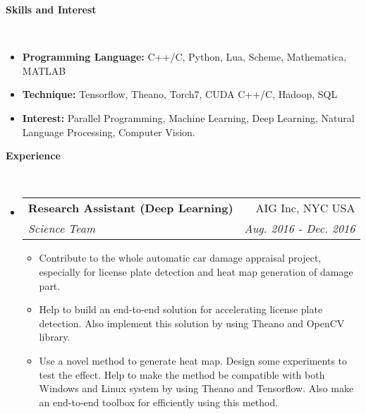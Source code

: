 \documentclass[a4paper,10pt]{article}
\makeatletter
\newcommand{\resitem}[1]{\item #1 \vspace{-2pt}}
\renewcommand{\normalsize}{\fontsize{12pt}{\baselineskip}\selectfont}
\newcommand{\resheading}[1]{{\large \colorbox{mygrey}{\begin{minipage}{\textwidth}{\textbf{#1 \vphantom{p\^{E}}}}\end{minipage}}}}
\newcommand{\ressubheading}[4]{
	\begin{tabular*}{6.5in}{l@{\extracolsep{\fill}}r}
		\textbf{#1} & #2 \\
		\textit{#3} & \textit{#4} \\
	\end{tabular*}\vspace{-6pt}}
\makeatother
\begin{document}
	\resheading{Skills and Interest}\\
	\begin{itemize}
		\item \textbf{Programming Language:} C++/C, Python, Lua, Scheme, Mathematica, MATLAB
		\item \textbf{Technique:} Tensorflow, Theano, Torch7, CUDA C++/C, Hadoop, SQL
		\item \textbf{Interest:} Parallel Programming, Machine Learning, Deep Learning, Natural Language Processing, Computer Vision.
	\end{itemize}
	
	\resheading{Experience}\\
	\begin{itemize}
		\item \ressubheading{\normalsize Research Assistant (Deep Learning)}{AIG Inc, NYC USA}{\normalsize Science Team}{Aug. 2016 - Dec. 2016}
		\begin{itemize}
			\resitem{Contribute to the whole automatic car damage appraisal project, especially for license plate detection and heat map generation of damage part.}
			\resitem{Help to build an end-to-end solution for accelerating license plate detection. Also implement this solution by using Theano and OpenCV library.}
			\resitem{Use a novel method to generate heat map. Design some experiments to test the effect. Help to make the method be compatible with both Windows and Linux system by using Theano and Tensorflow. Also make an end-to-end toolbox for efficiently using this method.}
		\end{itemize}
	\end{itemize}
	
\end{document}
